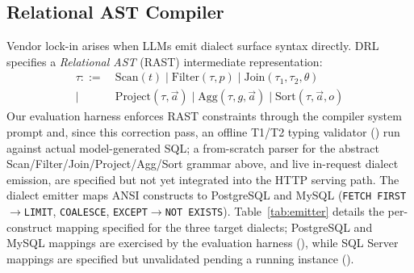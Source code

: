 \documentclass[twocolumn]{svjour3}
\begin{document}
\subsection{Relational AST Compiler}
\label{sec:rast}

Vendor lock-in arises when LLMs emit dialect surface syntax directly.
DRL specifies a \emph{Relational AST} (RAST) intermediate representation:
\begin{align*}
  \tau ::=\ & \text{Scan}(t)\mid \text{Filter}(\tau,p)\mid \text{Join}(\tau_1,\tau_2,\theta) \\
  \mid\ & \text{Project}(\tau,\vec{a})\mid \text{Agg}(\tau,g,\vec{a})\mid \text{Sort}(\tau,\vec{a},o)
\end{align*}
Our evaluation harness enforces RAST constraints through the compiler system prompt and, since this correction pass, an offline T1/T2 typing validator () run against actual model-generated SQL; a from-scratch parser for the abstract Scan/Filter/Join/Project/Agg/Sort grammar above, and live in-request dialect emission, are specified but not yet integrated into the HTTP serving path.
The dialect emitter maps ANSI constructs to PostgreSQL and MySQL (\texttt{FETCH FIRST}$\rightarrow$\texttt{LIMIT}, \texttt{COALESCE}, \texttt{EXCEPT}$\rightarrow$\texttt{NOT EXISTS}).
Table~\ref{tab:emitter} details the per-construct mapping specified for the three target dialects; PostgreSQL and MySQL mappings are exercised by the evaluation harness (), while SQL Server mappings are specified but unvalidated pending a running instance ().
\end{document}
